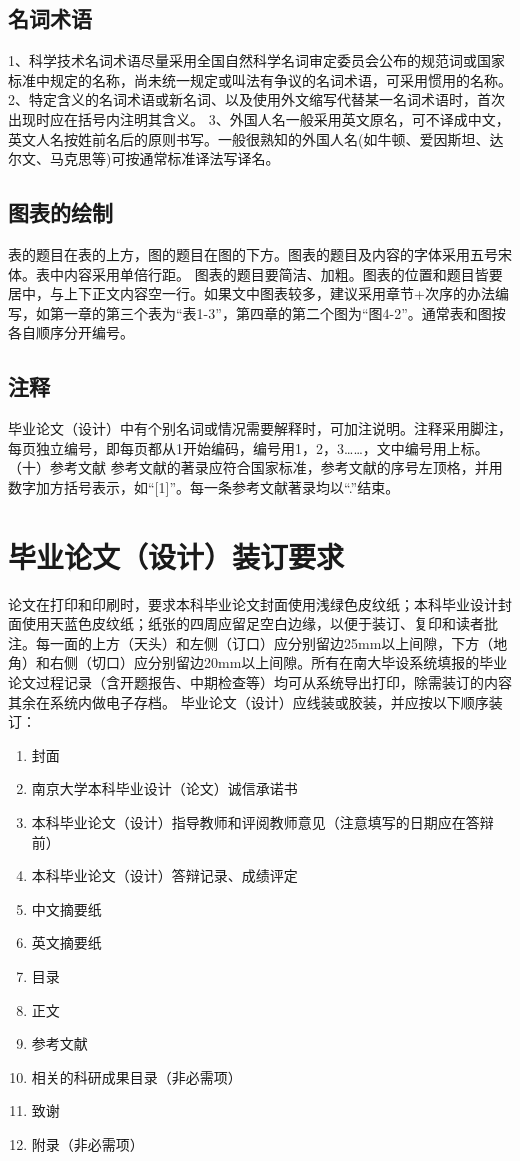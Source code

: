 \subsection{名词术语}
1、科学技术名词术语尽量采用全国自然科学名词审定委员会公布的规范词或国家标准中规定的名称，尚未统一规定或叫法有争议的名词术语，可采用惯用的名称。
2、特定含义的名词术语或新名词、以及使用外文缩写代替某一名词术语时，首次出现时应在括号内注明其含义。
3、外国人名一般采用英文原名，可不译成中文，英文人名按姓前名后的原则书写。一般很熟知的外国人名(如牛顿、爱因斯坦、达尔文、马克思等)可按通常标准译法写译名。

\subsection{图表的绘制}
表的题目在表的上方，图的题目在图的下方。图表的题目及内容的字体采用五号宋体。表中内容采用单倍行距。
图表的题目要简洁、加粗。图表的位置和题目皆要居中，与上下正文内容空一行。如果文中图表较多，建议采用章节+次序的办法编写，如第一章的第三个表为“表1-3”，第四章的第二个图为“图4-2”。通常表和图按各自顺序分开编号。

\subsection{注释}
毕业论文（设计）中有个别名词或情况需要解释时，可加注说明。注释采用脚注，每页独立编号，即每页都从1开始编码，编号用1，2，3……，文中编号用上标。
（十）参考文献
参考文献的著录应符合国家标准，参考文献的序号左顶格，并用数字加方括号表示，如“[1]”。每一条参考文献著录均以“.”结束。

\section{毕业论文（设计）装订要求}
论文在打印和印刷时，要求本科毕业论文封面使用浅绿色皮纹纸；本科毕业设计封面使用天蓝色皮纹纸；纸张的四周应留足空白边缘，以便于装订、复印和读者批注。每一面的上方（天头）和左侧（订口）应分别留边25mm以上间隙，下方（地角）和右侧（切口）应分别留边20mm以上间隙。所有在南大毕设系统填报的毕业论文过程记录（含开题报告、中期检查等）均可从系统导出打印，除需装订的内容其余在系统内做电子存档。
毕业论文（设计）应线装或胶装，并应按以下顺序装订：
\begin{enumerate}
    \item 封面
    \item 南京大学本科毕业设计（论文）诚信承诺书
    \item 本科毕业论文（设计）指导教师和评阅教师意见（注意填写的日期应在答辩前）
    \item 本科毕业论文（设计）答辩记录、成绩评定
    \item 中文摘要纸
    \item 英文摘要纸
    \item 目录
    \item 正文
    \item 参考文献
    \item 相关的科研成果目录（非必需项）
    \item 致谢
    \item 附录（非必需项）
\end{enumerate}
